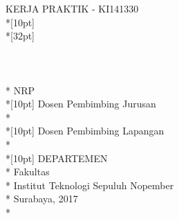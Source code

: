 \newpage

	\sffamily
	\thispagestyle{empty}
	{ \noindent KERJA PRAKTIK - KI141330 }\\*[10pt] 
	{\large\textbf{\MakeUppercase{\judul}}} \\*[32pt]
	\\
	\\
	\\
	\MakeUppercase{\penulis} \\*
	NRP \nrp \\*[10pt]
	Dosen Pembimbing Jurusan \\*
	\pembimbingJurusan \\*[10pt]
	Dosen Pembimbing Lapangan \\*
	\pembimbingLapangan \\*[10pt]
	DEPARTEMEN \MakeUppercase{\jurusan} \\*
	Fakultas \fakultas \\*
	Institut Teknologi Sepuluh Nopember \\*
	Surabaya, 2017 \\*
	\rmfamily
	\normalsize
	\restoregeometry
	\color{black}
	\cleardoublepage
